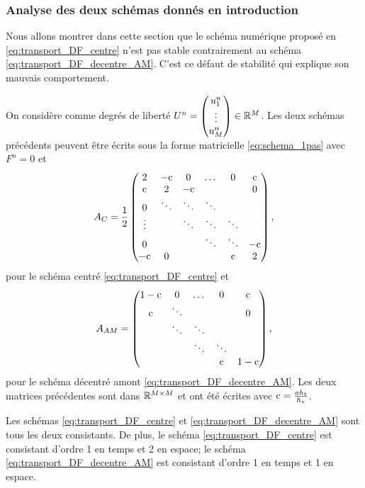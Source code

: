 \documentclass[12pt,a4paper,twoside]{article}
\begin{document}
\subsubsection{Analyse des deux sch\'emas donn\'es en introduction}


Nous allons montrer dans cette section que le sch\'ema num\'erique 
propos\'e en \eqref{eq:transport_DF_centre} n'est pas stable
contrairement au sch\'ema \eqref{eq:transport_DF_decentre_AM}.
C'est ce d\'efaut de stabilit\'e qui explique son mauvais comportement.

On consid\`ere comme degr\'es de libert\'e
$U^n = 
\begin{pmatrix}
  u_1^n \\ \vdots \\ u_{M}^n
\end{pmatrix}
\in \mathbb{R}^M
$.
Les deux sch\'emas pr\'ec\'edents peuvent \^etre \'ecrits sous la forme matricielle 
\eqref{eq:schema_1pas} avec $F^n = 0$ et
\begin{align}
  A_{C} = \dfrac{1}{2}
  \begin{pmatrix}
    2 & -\mathrm{c} & 0 & \dots & 0 & \mathrm{c}
    \\
    \mathrm{c} & 2 & -\mathrm{c} & & & 0
    \\
    0 & \ddots & \ddots & \ddots & &
    \\
    \vdots & & \ddots & \ddots & \ddots
    \\
    0 & & & \ddots & \ddots & -\mathrm{c}
    \\
    -\mathrm{c} & 0 & & & \mathrm{c} & 2
  \end{pmatrix},
\end{align}
pour le sch\'ema centr\'e \eqref{eq:transport_DF_centre}
et
\begin{align}
  A_{AM} = 
  \begin{pmatrix}
    1-\mathrm{c} & 0 & \dots & 0 & \mathrm{c}
    \\
    \mathrm{c} & \ddots & & & 0
    \\
    & \ddots & \ddots &   &
    \\
    & & \ddots & \ddots &
    \\
    &&   &  \mathrm{c} & 1-\mathrm{c}
  \end{pmatrix},
\end{align}
pour le sch\'ema d\'ecentr\'e amont \eqref{eq:transport_DF_decentre_AM}.
Les deux matrices pr\'ec\'edentes sont dans
$\mathbb{R}^{M \times M}$ et ont \'et\'e \'ecrites avec 
$\mathrm{c} = \frac{a h_t}{h_x}$.

\begin{proposition}
  \label{prop:consistance_2_schemas}
  Les sch\'emas \eqref{eq:transport_DF_centre} et \eqref{eq:transport_DF_decentre_AM}
  sont tous les deux consistants.
  De plus, le sch\'ema \eqref{eq:transport_DF_centre} est consistant d'ordre 1
  en temps et 2 en espace;
  le sch\'ema \eqref{eq:transport_DF_decentre_AM} est consistant d'ordre 1
  en temps et 1 en espace.
\end{proposition}
\end{document}
